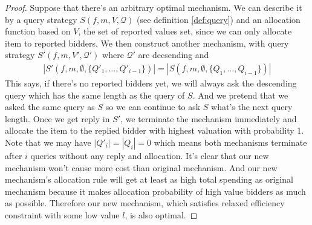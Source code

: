 \begin{proof}
Suppose that there's an arbitrary optimal mechanism. We can describe it by a
query strategy $S(f, m, V, \mathcal Q)$ (see definition \ref{def:query}) and an
allocation function based on $V$, the set of reported values set, since we can
only allocate item to reported bidders. We then construct another mechanism,
with query strategy $S'(f, m, V', \mathcal Q')$ where $\mathcal Q'$ are decsending
and 
\begin{align*}
|S'(f, m, \emptyset, \{Q'_1, \ldots, Q'_{i-1}\})| %
  = |S(f, m, \emptyset, \{Q_1, \ldots, Q_{i-1}\})|
\end{align*}
This says, if there's no reported bidders yet, we will always ask the
descending query which has the same length as the query of $S$. And we pretend
that we asked the same query as $S$ so we can continue to ask $S$ what's the
next query length. Once we get reply in $S'$, we terminate the mechanism
immediately and allocate the item to the replied bidder with highest valuation
with probability 1.  Note that we may have $|Q'_i| = |Q_i| = 0$ which means
both mechanisms terminate after $i$ queries without any reply and allocation.
It's clear that our new mechanism won't cause more cost than original
mechanism.  And our new mechanism's allocation rule will get at least as high
total spending as original mechanism because it makes allocation probability of
high value bidders as much as possible. Therefore our new mechanism, which
satisfies relaxed efficiency constraint with some low value $l$, is also
optimal.
%
%
\end{proof}

